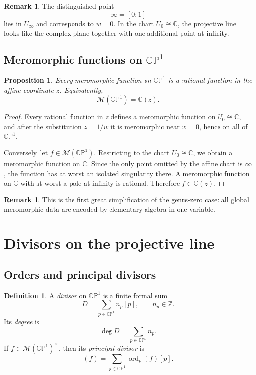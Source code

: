 \documentclass[11pt]{article}
\newcommand{\C}{\mathbb{C}}
\newcommand{\Z}{\mathbb{Z}}
\newcommand{\CP}{\mathbb{CP}}
\newcommand{\MM}{\mathcal{M}}
\newcommand{\ord}{\operatorname{ord}}
\newcommand{\degd}{\operatorname{deg}}
\newcommand{\CPone}{\CP^1}
\theoremstyle{plain}
\newtheorem{proposition}[theorem]{Proposition}
\theoremstyle{definition}
\newtheorem{definition}[theorem]{Definition}
\newtheorem{remark}[theorem]{Remark}
\begin{document}
\begin{remark}
The distinguished point
\[
\infty=[0:1]
\]
lies in $U_{\infty}$ and corresponds to $w=0$. In the chart $U_0\cong\C$, the projective line looks like the complex plane together with one additional point at infinity.
\end{remark}

\subsection{Meromorphic functions on \texorpdfstring{$\CPone$}{CP1}}
\begin{proposition}
Every meromorphic function on $\CPone$ is a rational function in the affine coordinate $z$. Equivalently,
\[
\MM(\CPone)=\C(z).
\]
\end{proposition}

\begin{proof}
Every rational function in $z$ defines a meromorphic function on $U_0\cong\C$, and after the substitution $z=1/w$ it is meromorphic near $w=0$, hence on all of $\CPone$.

Conversely, let $f\in\MM(\CPone)$. Restricting to the chart $U_0\cong\C$, we obtain a meromorphic function on $\C$. Since the only point omitted by the affine chart is $\infty$, the function has at worst an isolated singularity there. A meromorphic function on $\C$ with at worst a pole at infinity is rational. Therefore $f\in\C(z)$.
\end{proof}

\begin{remark}
This is the first great simplification of the genus-zero case: all global meromorphic data are encoded by elementary algebra in one variable.
\end{remark}

\section{Divisors on the projective line}
\subsection{Orders and principal divisors}
\begin{definition}
A \emph{divisor} on $\CPone$ is a finite formal sum
\[
D=\sum_{p\in \CPone} n_p[p],\qquad n_p\in\Z.
\]
Its \emph{degree} is
\[
\degd D=\sum_{p\in\CPone} n_p.
\]
If $f\in\MM(\CPone)^\times$, then its \emph{principal divisor} is
\[
(f)=\sum_{p\in\CPone}\ord_p(f)[p].
\]
\end{definition}
\end{document}
